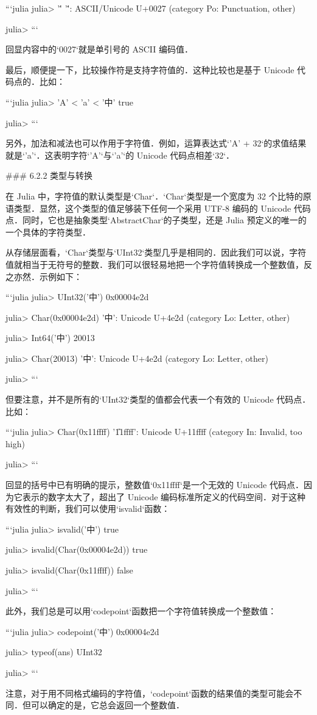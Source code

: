 ```julia
julia> '\''
'\'': ASCII/Unicode U+0027 (category Po: Punctuation, other)

julia> 
```

回显内容中的`0027`就是单引号的 ASCII 编码值．

最后，顺便提一下，比较操作符是支持字符值的．这种比较也是基于 Unicode 代码点的．比如：

```julia
julia> 'A' < 'a' < '中'
true

julia> 
```

另外，加法和减法也可以作用于字符值．例如，运算表达式`'A' + 32`的求值结果就是`'a'`．这表明字符`'A'`与`'a'`的 Unicode 代码点相差`32`． 

### 6.2.2 类型与转换

在 Julia 中，字符值的默认类型是`Char`．`Char`类型是一个宽度为 32 个比特的原语类型．显然，这个类型的值足够装下任何一个采用 UTF-8 编码的 Unicode 代码点．同时，它也是抽象类型`AbstractChar`的子类型，还是 Julia 预定义的唯一的一个具体的字符类型．

从存储层面看，`Char`类型与`UInt32`类型几乎是相同的．因此我们可以说，字符值就相当于无符号的整数．我们可以很轻易地把一个字符值转换成一个整数值，反之亦然．示例如下：

```julia
julia> UInt32('中')
0x00004e2d

julia> Char(0x00004e2d)
'中': Unicode U+4e2d (category Lo: Letter, other) 

julia> Int64('中')
20013

julia> Char(20013)
'中': Unicode U+4e2d (category Lo: Letter, other)

julia> 
```

但要注意，并不是所有的`UInt32`类型的值都会代表一个有效的 Unicode 代码点．比如：

```julia
julia> Char(0x11ffff)
'\U11ffff': Unicode U+11ffff (category In: Invalid, too high)

julia> 
```

回显的括号中已有明确的提示，整数值`0x11ffff`是一个无效的 Unicode 代码点．因为它表示的数字太大了，超出了 Unicode 编码标准所定义的代码空间．对于这种有效性的判断，我们可以使用`isvalid`函数：

```julia
julia> isvalid('中')
true

julia> isvalid(Char(0x00004e2d))
true

julia> isvalid(Char(0x11ffff))
false

julia> 
```

此外，我们总是可以用`codepoint`函数把一个字符值转换成一个整数值：

```julia
julia> codepoint('中')
0x00004e2d

julia> typeof(ans)
UInt32

julia> 
```

注意，对于用不同格式编码的字符值，`codepoint`函数的结果值的类型可能会不同．但可以确定的是，它总会返回一个整数值．
